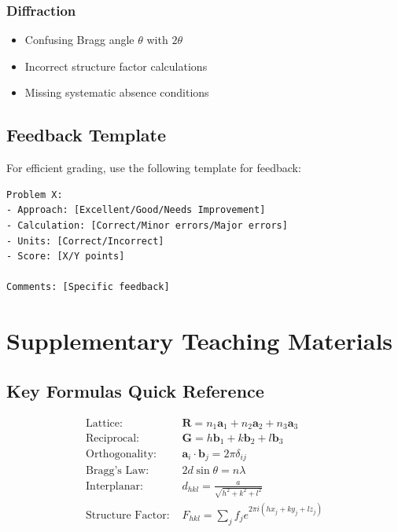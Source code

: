 \documentclass[12pt,a4paper]{article}
\begin{document}
\subsubsection{Diffraction}
\begin{itemize}
    \item Confusing Bragg angle $\theta$ with $2\theta$
    \item Incorrect structure factor calculations
    \item Missing systematic absence conditions
\end{itemize}

\subsection{Feedback Template}
For efficient grading, use the following template for feedback:

\begin{verbatim}
Problem X:
- Approach: [Excellent/Good/Needs Improvement]
- Calculation: [Correct/Minor errors/Major errors]
- Units: [Correct/Incorrect]
- Score: [X/Y points]

Comments: [Specific feedback]
\end{verbatim}

\section{Supplementary Teaching Materials}

\subsection{Key Formulas Quick Reference}
\begin{align*}
\text{Lattice: } & \mathbf{R} = n_1\mathbf{a}_1 + n_2\mathbf{a}_2 + n_3\mathbf{a}_3 \\
\text{Reciprocal: } & \mathbf{G} = h\mathbf{b}_1 + k\mathbf{b}_2 + l\mathbf{b}_3 \\
\text{Orthogonality: } & \mathbf{a}_i \cdot \mathbf{b}_j = 2\pi\delta_{ij} \\
\text{Bragg's Law: } & 2d\sin\theta = n\lambda \\
\text{Interplanar: } & d_{hkl} = \frac{a}{\sqrt{h^2+k^2+l^2}} \\
\text{Structure Factor: } & F_{hkl} = \sum_j f_j e^{2\pi i(hx_j+ky_j+lz_j)}
\end{align*}
\end{document}
